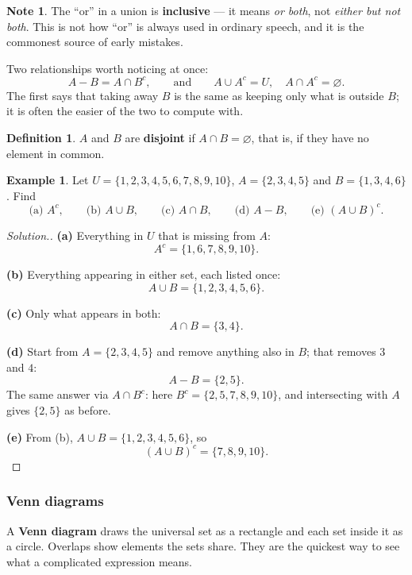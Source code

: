 \documentclass[11pt,a4paper]{article}
\theoremstyle{definition}
\newtheorem{definition}[thm]{Definition}
\newtheorem{example}[thm]{Example}
\newtheorem{note}[thm]{Note}
\newenvironment{solution}
  {\renewcommand{\qedsymbol}{}\begin{proof}[\textit{Solution}.]}
  {\end{proof}}
\begin{document}
\begin{note}
The ``or'' in a union is \textbf{inclusive} --- it means \emph{or both}, not
\emph{either but not both}. This is not how ``or'' is always used in ordinary
speech, and it is the commonest source of early mistakes.
\end{note}

Two relationships worth noticing at once:
$$A-B=A\cap B^c,\qquad\text{and}\qquad A\cup A^c=U,\quad A\cap A^c=\varnothing.$$
The first says that taking away $B$ is the same as keeping only what is outside $B$;
it is often the easier of the two to compute with.

\begin{definition}
$A$ and $B$ are \textbf{disjoint} if $A\cap B=\varnothing$, that is, if they have no
element in common.
\end{definition}

\begin{example}
Let $U=\{1,2,3,4,5,6,7,8,9,10\}$, $A=\{2,3,4,5\}$ and $B=\{1,3,4,6\}$. Find
$$\text{(a) } A^c,\qquad \text{(b) } A\cup B,\qquad \text{(c) } A\cap B,
\qquad \text{(d) } A-B,\qquad \text{(e) } (A\cup B)^c.$$
\end{example}

\begin{solution}
\textbf{(a)} Everything in $U$ that is missing from $A$:
$$A^c=\{1,6,7,8,9,10\}.$$

\textbf{(b)} Everything appearing in either set, each listed once:
$$A\cup B=\{1,2,3,4,5,6\}.$$

\textbf{(c)} Only what appears in both:
$$A\cap B=\{3,4\}.$$

\textbf{(d)} Start from $A=\{2,3,4,5\}$ and remove anything also in $B$; that removes
$3$ and $4$:
$$A-B=\{2,5\}.$$
The same answer via $A\cap B^c$: here $B^c=\{2,5,7,8,9,10\}$, and intersecting with
$A$ gives $\{2,5\}$ as before.

\textbf{(e)} From (b), $A\cup B=\{1,2,3,4,5,6\}$, so
$$(A\cup B)^c=\{7,8,9,10\}.$$
\end{solution}

\subsubsection{Venn diagrams}

A \textbf{Venn diagram} draws the universal set as a rectangle and each set inside it
as a circle. Overlaps show elements the sets share. They are the quickest way to see
what a complicated expression means.
\end{document}

